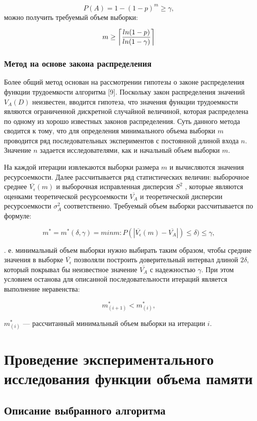 $$P(A) = 1 - (1 - p)^m \geq \gamma,$$
 можно получить требуемый объем выборки:

$$m \geq \ceil*{ \frac{ln(1 - p)}{ln(1 - \gamma)}}$$

\subsubsection{Метод на основе закона распределения}

Более общий метод основан на рассмотрении гипотезы о законе распределения функции трудоемкости алгоритма [9]. Поскольку закон распределения значений $V_A(D)$ неизвестен, вводится гипотеза, что значения функции трудоемкости являются ограниченной дискретной случайной величиной, которая распределена по одному из хорошо известных законов распределения. Суть данного метода сводится к тому, что для определения минимального объема выборки $m$ проводится ряд последовательных экспериментов с постоянной длиной входа $n$. Значение $n$ задается исследователями, как и начальный объем выборки $m$.

На каждой итерации извлекаются выборки размера $m$ и вычисляются значения ресурсоемкости. Далее рассчитывается ряд статистических величин: выборочное среднее $\overline{V_{\epsilon}}(m)$ и выборочная исправленная дисперсия $S^2$ , которые являются оценками теоретической ресурсоемкости $\overline{V_A}$ и теоретической дисперсии ресурсоемкости $\sigma^2_A$ соответственно. Требуемый объем выборки рассчитывается по формуле:

$$m^* = m^*(\delta, \gamma) = min m : P(|\overline{V_{\epsilon}}(m) - \overline{V_A}|) \leq \delta) \leq \gamma,$$

. е. минимальный объем выборки нужно выбирать таким образом, чтобы средние значения в выборке $\overline{V_{\epsilon}}$ позволяли построить доверительный интервал длиной $2\delta$, который покрывал бы неизвестное значение $\overline{V_A}$ с надежностью $\gamma$.
При этом условием останова для описанной последовательности итераций является выполнение неравенства:

$$m^*_{(i+1)} < m^*_{(i)},$$

 $m^*_{(i)}$ — рассчитанный минимальный объем выборки на итерации $i$.

\pagebreak
\section{Проведение экспериментального исследования функции объема памяти}
\subsection{Описание выбранного алгоритма}

